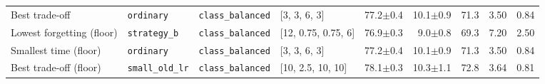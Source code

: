 \begin{tabular}{@{}llllrrrrr@{}}
Best trade-off & \texttt{ordinary} & \texttt{class\_balanced} & [3, 3, 6, 3] & 77.2{\scriptsize$\pm$0.4} & 10.1{\scriptsize$\pm$0.9} & 71.3 & 3.50 & 0.84 \\
Lowest forgetting (floor) & \texttt{strategy\_b} & \texttt{class\_balanced} & [12, 0.75, 0.75, 6] & 76.9{\scriptsize$\pm$0.3} & 9.0{\scriptsize$\pm$0.8} & 69.3 & 7.20 & 2.50 \\
Smallest time (floor) & \texttt{ordinary} & \texttt{class\_balanced} & [3, 3, 6, 3] & 77.2{\scriptsize$\pm$0.4} & 10.1{\scriptsize$\pm$0.9} & 71.3 & 3.50 & 0.84 \\
Best trade-off (floor) & \texttt{small\_old\_lr} & \texttt{class\_balanced} & [10, 2.5, 10, 10] & 78.1{\scriptsize$\pm$0.3} & 10.3{\scriptsize$\pm$1.1} & 72.8 & 3.64 & 0.81 \\

\bottomrule
\end{tabular}
